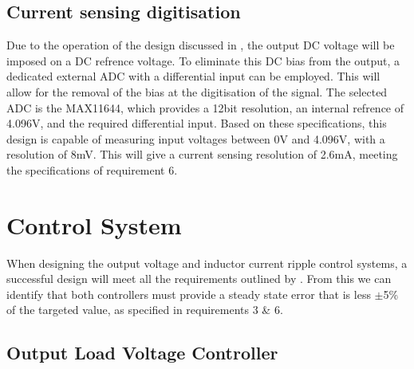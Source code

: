 
\subsection*{Current sensing digitisation}\label{S:current_sense_ADC_design}

Due to the operation of the design discussed in , the output DC voltage will be imposed on a DC refrence voltage. To eliminate this DC bias from the output, a dedicated external ADC with a differential input can be employed. This will allow for the removal of the bias at the digitisation of the signal. The selected ADC is the MAX11644, which provides a 12bit resolution, an internal refrence of 4.096V, and the required differential input. 
Based on these specifications, this design is capable of measuring input voltages between 0V and 4.096V, with a resolution of 8mV. This will give a current sensing resolution of 2.6mA, meeting the specifications of requirement 6.




%
%

\section{Control System}\label{S:control_design}

When designing the output voltage and inductor current ripple control systems, a successful design will meet all the requirements outlined by . From this we can identify that both controllers must provide a steady state error that is less $\pm$5\% of the targeted value, as specified in requirements 3 \& 6. 

\subsection{Output Load Voltage Controller}\label{S:output_control_design}

